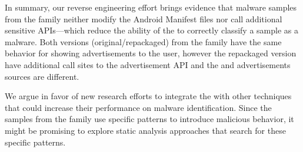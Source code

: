 In summary, our reverse engineering effort brings evidence that malware
samples from the \gps family neither modify the Android Manifest
files nor call additional sensitive APIs---which reduce the ability
of the \mas to correctly classify a sample as a malware. Both versions (original/repackaged) from the \gps family have the same behavior for showing advertisements to the user,
however the repackaged version have additional call sites to the advertisement API and the and advertisements sources are different.

We argue in favor of new research efforts to integrate the \mas 
with other techniques that could increase their performance
on malware identification. Since the samples from the \gps
family use specific patterns to introduce malicious behavior,
it might be promising to explore static analysis approaches that
search for these specific patterns. 










